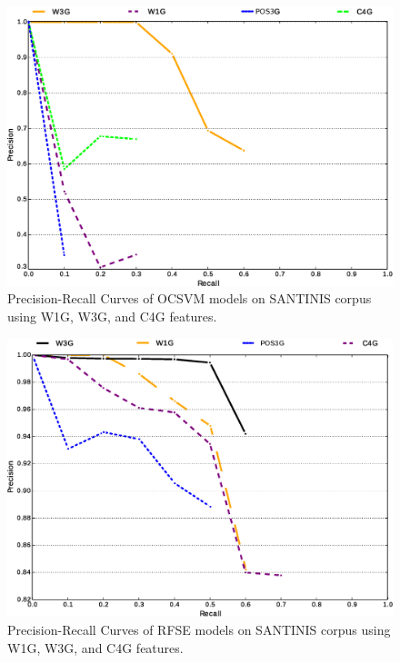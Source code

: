 \begin{figure}[t]
	\begin{center}
    \includegraphics[scale=0.45]{Figures/OCSME_Best_per_DocRep.eps}
	\caption{Precision-Recall Curves of OCSVM models on SANTINIS corpus using W1G, W3G, and C4G features.}
	\label{chap:noise:fig:MacroPRC_OCSVME_W3G_W1G_C4G_OPTIMAL_SANTINIS}
	\end{center}
\end{figure}

\begin{figure}[t]
	\begin{center}
    \includegraphics[scale=0.45]{Figures/RFSE_Best_per_DocRep.eps}
	\caption{Precision-Recall Curves of RFSE models on SANTINIS corpus using W1G, W3G, and C4G features.}
	\label{chap:noise:fig:MacroPRC_RFSE_W3G_W1G_C4G_OPTIMAL_SANTINIS}
	\end{center}
\end{figure}

